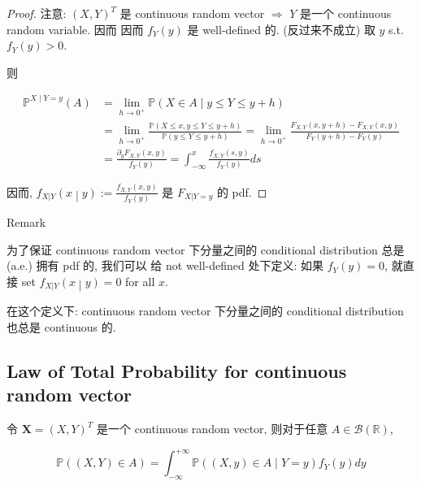 \documentclass{qlnotes-export}
\begin{document}
\begin{proof}

注意: \((X,Y)^{T}\) 是 continuous random vector \(\Longrightarrow\) \(Y\) 是一个 continuous random variable. 因而 因而 \(f_{Y}(y)\) 是 well-defined 的. (反过来不成立) 取 \(y\) s.t. \(f_{Y}(y) > 0\).

则

\[\begin{matrix}
{{\mathbb{P}}^{X \mid Y = y}(A)} & {= \lim\limits_{h\rightarrow 0^{+}}{\mathbb{P}}(X \in A \mid y \leq Y \leq y + h)} \\
 & {= \lim\limits_{h\rightarrow 0^{+}}\frac{{\mathbb{P}}(X \leq x,y \leq Y \leq y + h)}{{\mathbb{P}}(y \leq Y \leq y + h)} = \lim\limits_{h\rightarrow 0^{+}}\frac{F_{X,Y}(x,y + h) - F_{X,Y}(x,y)}{F_{Y}(y + h) - F_{Y}(y)}} \\
 & {= \frac{\partial_{y}F_{X,Y}(x,y)}{f_{Y}(y)} = \int_{- \infty}^{x}\frac{f_{X,Y}(s,y)}{f_{Y}(y)}ds}
\end{matrix}\]

因而, \(\left. f_{X|Y}(x \middle| y) := \frac{f_{X,Y}(x,y)}{f_{Y}(y)} \right.\) 是 \(F_{X|Y = y}\) 的 pdf.

\end{proof}

\begin{qlremark}{Remark}

为了保证 continuous random vector 下分量之间的 conditional distribution 总是 (a.e.) 拥有 pdf 的, 我们可以 给 not well-defined 处下定义: 如果 \(f_{Y}(y) = 0\), 就直接 set \(\left. f_{X|Y}(x \middle| y) = 0 \right.\) for all \(x\).

在这个定义下: continuous random vector 下分量之间的 conditional distribution 也总是 continuous 的.

\end{qlremark}

\subsection{Law of Total Probability for continuous random vector}\label{law-of-total-probability-for-continuous-random-vector}

\begin{theorem}\label{thm-03-joint-conditional-distribution-theorem-006}

令 \(\mathbf{X} = (X,Y)^{T}\) 是一个 continuous random vector, 则对于任意 \(A \in \mathcal{B}({\mathbb{R}})\),

\[{\mathbb{P}}((X,Y) \in A) = \int_{- \infty}^{+ \infty}{\mathbb{P}}((X,y) \in A \mid Y = y)f_{Y}(y)dy\]

\end{theorem}
\end{document}

